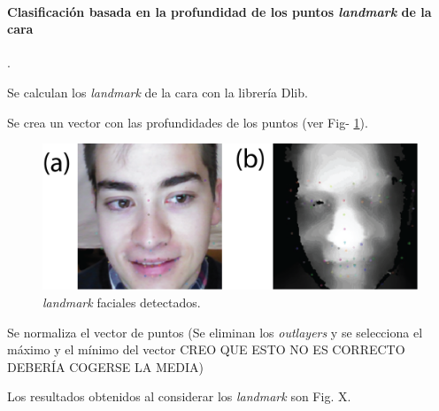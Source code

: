 \paragraph{\textbf{Clasificación basada en la profundidad de los puntos \textit{landmark} de la cara}}.

Se calculan los \textit{landmark} de la cara con la librería \Gls{Dlib}.

Se crea un vector con las profundidades de los puntos (ver Fig- \ref{fig:LANDMARK_DETECTADOS}). 

\begin{figure}
\centering
\includegraphics[width=1\textwidth]{ch-sistemasABC/images/ch-evaluacion_topologias/LANDMARK_DETECTADOS.png}
    \caption{\textit{landmark} faciales detectados.}
    \label{fig:LANDMARK_DETECTADOS}
\end{figure}

Se normaliza el vector de puntos (Se eliminan los \textit{outlayers} y se selecciona el máximo y el mínimo del vector CREO QUE ESTO NO ES CORRECTO DEBERÍA COGERSE LA MEDIA)

Los resultados obtenidos al considerar los \textit{landmark} son Fig. X. 

